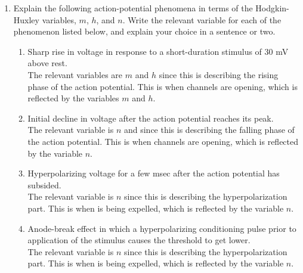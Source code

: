 \documentclass[11pt]{article}
\begin{document}
\begin{enumerate}[label=\arabic*.]
\begin{enumerate}[label=(\alph*)]
\newpage
\item
Explain the following action-potential phenomena in terms of the Hodgkin-Huxley variables, $m$, $h$, and $n$. Write the relevant variable for each of the phenomenon listed below, and explain your choice in a sentence or two.
\begin{enumerate}[label=(\roman*)]
\item
Sharp rise in voltage in response to a short-duration stimulus of $30$ mV above rest.
\vspace*{1\baselineskip}
\\
The relevant variables are $m$ and $h$ since this is describing the rising phase of the action potential. This is when  channels are opening, which is reflected by the variables $m$ and $h$.



\item
Initial decline in voltage after the action potential reaches its peak.
\vspace*{1\baselineskip}
\\
The relevant variable is $n$ and since this is describing the falling phase of the action potential. This is when  channels are opening, which is reflected by the variable $n$.



\item
Hyperpolarizing voltage for a few msec after the action potential has subsided.
\vspace*{1\baselineskip}
\\
The relevant variable is $n$ since this is describing the hyperpolarization part. This is when  is being expelled, which is reflected by the variable $n$.



\item
Anode-break effect in which a hyperpolarizing conditioning pulse prior to application of the stimulus causes the threshold to get lower.
\vspace*{1\baselineskip}
\\
The relevant variable is $n$ since this is describing the hyperpolarization part. This is when  is being expelled, which is reflected by the variable $n$.
\end{enumerate}
\end{enumerate}




\end{enumerate}
\end{document}
